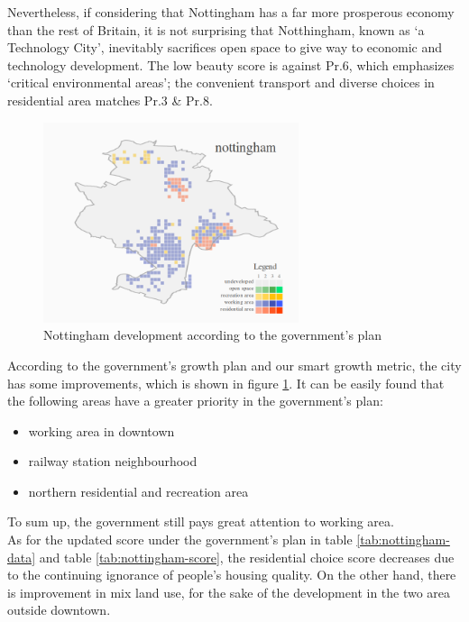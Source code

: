 Nevertheless, if considering that Nottingham has a far more prosperous economy than the rest of Britain, it is not surprising that Notthingham, known as `a Technology City', inevitably sacrifices open space to give way to economic and technology development.
The low beauty score is against Pr.6, which emphasizes `critical environmental areas';
the convenient transport and diverse choices in residential area matches Pr.3 \& Pr.8.\\

\begin{figure}[htb]
  \label{fig:nottingham-patch-diff}
  \centering
  \includegraphics[width=7.5cm]{pic/nottingham-patch-diff-development.png}
  \caption{Nottingham development according to the government's plan}
\end{figure}
According to the government's growth plan and our smart growth metric, the city has some improvements, which is shown in figure \ref{fig:nottingham-patch-diff}.
It can be easily found that the following areas have a greater priority in the government's plan:
\begin{itemize}
  \item working area in downtown
  \item railway station neighbourhood
  \item northern residential and recreation area
\end{itemize}
To sum up, the government still pays great attention to working area.\\

As for the updated score under the government's plan in table \ref{tab:nottingham-data} and table \ref{tab:nottingham-score}, the residential choice score decreases due to the continuing ignorance of people's housing quality.
On the other hand, there is improvement in mix land use, for the sake of the development in the two area outside downtown.\\

